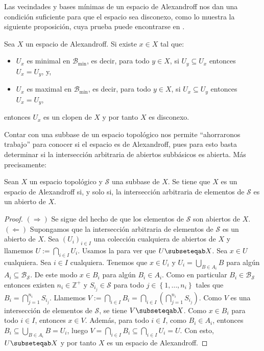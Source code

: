 Las vecindades y bases mínimas de un espacio de Alexandroff nos dan una condición suficiente para que el espacio sea disconexo, como lo muestra la siguiente proposición, cuya prueba puede encontrarse en \cite{jafarian2013}.
\begin{Prop}\label{Prop:Conexo_Alexandroff}
   Sea $X$ un espacio de Alexandroff. Si existe $x\in X$ tal que:
   \begin{itemize}
      \item $U_x$ es minimal en $\mathcal{B}_{\operatorname{min}}$, es decir, para todo $y\in X$, si $U_y\subseteq U_x$ entonces $U_x=U_y$, y,
      \item $U_x$ es maximal en $\mathcal{B}_{\operatorname{min}}$, es decir, para todo $y\in X$, si $U_x\subseteq U_y$ entonces $U_x=U_y$,
   \end{itemize}
   entonces $U_x$ es un clopen de $X$ y por tanto $X$ es disconexo.
\end{Prop}
Contar con una subbase de un espacio topológico nos permite ``ahorraronos trabajo'' para conocer si el espacio es de Alexandroff, pues para esto basta determinar si la intersección arbitraria de abiertos subbásicos es abierta. Más precisamente:
\begin{Prop}\label{Prop:Alexandroff_con_subbase}
   Sean $X$ un espacio topológico y $\mathcal{S}$ una subbase de $X$. Se tiene que $X$ es un espacio de Alexandroff si, y solo si, la intersección arbitraria de elementos de $\mathcal{S}$ es un abierto de $X$.
\end{Prop}
\begin{proof}
   $(\Rightarrow)$ Se sigue del hecho de que los elementos de $\mathcal{S}$ son abiertos de $X$.\\
   $(\Leftarrow)$ Supongamos que la intersección arbitraria de elementos de $\mathcal{S}$ es un abierto de $X$. Sea $\left( U_i\right)_{i\in I}$ una colección cualquiera de abiertos de $X$ y llamemos $U:=\bigcap_{i\in I}U_i$. Usamos la  para ver que $U \subseteqab X$. Sea $x\in U$ cualquiera. Sea $i\in I$ cualquiera. Tenemos que $x\in U_i$ y $U_i=\bigcup_{B\in A_i}B$ para algún $A_i\subseteq \mathcal{B}_{\mathcal{S}}$. De este modo $x\in B_i$ para algún $B_i\in A_i$. Como en particular $B_i\in \mathcal{B}_\mathcal{S}$ entonces existen $n_i\in \mathbb{Z}^+$ y $S_{i_j}\in \mathcal{S}$ para todo $j\in\left\lbrace 1,\dots ,n_i\right\rbrace$ tales que $B_i=\bigcap_{j=1}^{n_i}S_{i_j}$. Llamemos $V:=\bigcap_{i\in I}B_i=\bigcap_{i\in I}\left( \bigcap_{j=1}^{n_i}S_{i_j}\right)$. Como $V$ es una intersección de elementos de $\mathcal{S}$, se tiene $V\subseteqab X$. Como $x\in B_i$ para todo $i\in I$, entonces $x\in V$. Además, para todo $i\in I$, como $B_i\in A_i$, entonces $B_i\subseteq \bigcup_{B\in A_i}B=U_i$, luego $V=\bigcap_{i\in I}B_i\subseteq \bigcap_{i\in I}U_i=U$. Con esto, $U\subseteqab X$ y por tanto $X$ es un espacio de Alexandroff.
\end{proof}

